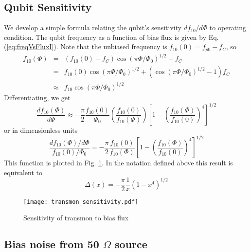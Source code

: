 \documentclass[twocolumn]{article}
\begin{document}
\subsection{Qubit Sensitivity}

We develop a simple formula relating the qubit's sensitivity $df_{10}/d\Phi$ to operating condition. The qubit frequency as a function of bias flux is given by Eq. (\ref{eq:freqVsFluxI}). Note that the unbiased frequency is $f_{10}(0) = f_{p0} - f_C$, so \begin{eqnarray*}
f_{10}(\Phi) &=& (f_{10}(0)+f_C)\cos \left( \pi \Phi/\Phi_0 \right)^{1/2} - f_C \\
&=& f_{10}(0)\cos \left( \pi \Phi/\Phi_0 \right)^{1/2} + \left( \cos \left( \pi \Phi/\Phi_0 \right)^{1/2} - 1\right)f_C \\
&\approx& f_{10}\cos \left( \pi \Phi/\Phi_0 \right)^{1/2} \end{eqnarray*}
Differentiating, we get \begin{equation}
\frac{df_{10}(\Phi)}{d\Phi} \approx - \frac{\pi}{2}\frac{f_{10}(0)}{\Phi_0}\left(\frac{f_{10}(0)}{f_{10}(\Phi)}\right) \left[1- \left(\frac{f_{10}(\Phi)}{f_{10}(0)}\right)^4 \right]^{1/2} \end{equation}
or in dimensionless units \begin{equation}
\frac{df_{10}(\Phi)/d\Phi}{f_{10}(0)/\Phi_0} = -\frac{\pi}{2}\frac{f_{10}(0)}{f_{10}(\Phi)} \left[1- \left(\frac{f_{10}(\Phi)}{f_{10}(0)}\right)^4 \right]^{1/2} \label{eq:transmonSensitivity} \end{equation}
This function is plotted in Fig. \ref{Fig:transmonSensitivity}. In the notation defined above this result is equivalent to \begin{equation}
\Delta(x) = -\frac{\pi}{2}\frac{1}{x}\left( 1 - x^4 \right)^{1/2} \end{equation}

\begin{figure}
\begin{centering}
\texttt{[image: transmon\_sensitivity.pdf]}
\par\end{centering}
\caption{Sensitivity of transmon to bias flux}
\label{Fig:transmonSensitivity}
\end{figure}

\subsection{Bias noise from 50 $\Omega$ source}
\end{document}
